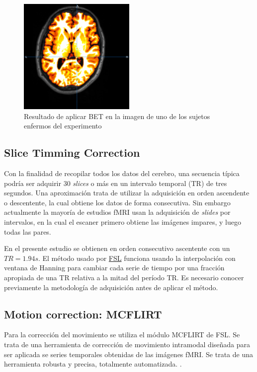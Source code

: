  \begin{figure}[H]
	\centering
	\includegraphics[width=0.5\textwidth]{img/preproc/bet.png}
	\caption{Resultado de aplicar BET en la imagen de uno de los sujetos enfermos del experimento}
	\label{preproc:bet}
\end{figure}

\subsection{Slice Timming Correction}

Con la finalidad de recopilar todos los datos del cerebro, una secuencia típica podría ser adquirir 30 \textit{slices} o más en un intervalo temporal (TR) de tres segundos. Una aproximación trata de utilizar la adquisición en orden ascendente o descentente, la cual obtiene los datos de forma consecutiva. Sin embargo actualmente la mayoría de estudios fMRI usan la adquisición de \textit{slides} por intervalos, en la cual el escaner primero obtiene las imágenes impares, y luego todas las pares.

En el presente estudio se obtienen en orden consecutivo ascentente con un $TR=1.94s$. El método usado por \hyperref[glos:fsl]{FSL} funciona usando la interpolación con ventana de Hanning para cambiar cada serie de tiempo por una fracción apropiada de una TR relativa a la mitad del período TR. Es necesario conocer previamente la metodología de adquisición antes de aplicar el método.

\subsection{Motion correction: MCFLIRT}

 Para la corrección del movimiento se utiliza el módulo MCFLIRT de FSL. Se trata de una herramienta de corrección de movimiento intramodal diseñada para ser aplicada se series temporales obtenidas de las imágenes fMRI. Se trata de una herramienta robusta y precisa, totalmente automatizada. \cite{mcflirt}.
 
